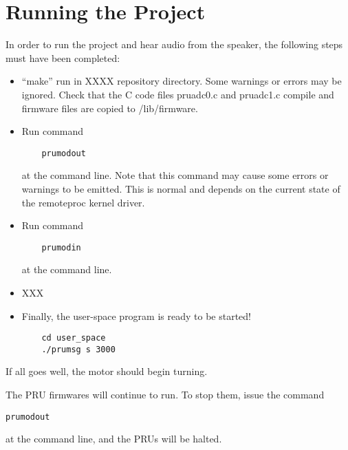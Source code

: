 \chapter{Running the Project}

In order to run the project and hear audio from the speaker, the following steps must have been completed:

\begin{itemize}
	\item ``make'' run in XXXX repository directory.  Some warnings or errors may be ignored.  Check that the C code files pruadc0.c and pruadc1.c compile and firmware files are copied to /lib/firmware.
	\item Run command 
	
	\begin{verbatim}
	prumodout
	\end{verbatim} 
	
	at the command line.  Note that this command may cause some errors or warnings to be emitted.
	This is normal and depends on the current state of the remoteproc kernel driver.
	\item Run command 
	
	\begin{verbatim}
	prumodin
	\end{verbatim} 
	
	at the command line.
	\item XXX
	\item  Finally, the user-space program is ready to be started!
	
	\begin{verbatim}
	cd user_space
	./prumsg s 3000
	\end{verbatim}
\end{itemize}

If all goes well, the motor should begin turning.

The PRU firmwares will continue to run.  To stop them, issue the command

\begin{verbatim}
prumodout
\end{verbatim}

at the command line, and the PRUs will be halted.
